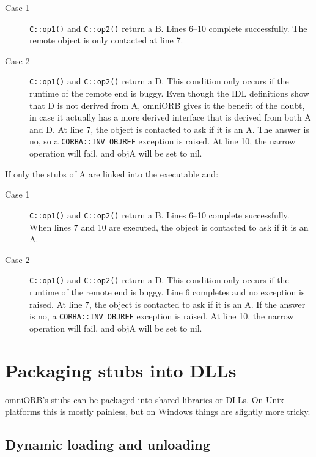 \documentclass[11pt,oneside,a4paper]{book}
\newcommand{\code}[1]{\texttt{#1}}
\newcommand{\op}[1]{\texttt{#1()}}
\begin{document}
\begin{description}
\item[Case 1] \op{C::op1} and \op{C::op2} return a B. Lines 6--10
complete successfully. The remote object is only contacted at line 7.

\item[Case 2] \op{C::op1} and \op{C::op2} return a D. This condition
only occurs if the runtime of the remote end is buggy. Even though the
IDL definitions show that D is not derived from A, omniORB gives it
the benefit of the doubt, in case it actually has a more derived
interface that is derived from both A and D. At line 7, the object is
contacted to ask if it is an A. The answer is no, so a
\code{CORBA::INV\_OBJREF} exception is raised. At line 10, the narrow
operation will fail, and objA will be set to nil.
\end{description}

\noindent If only the stubs of A are linked into the executable and:

\begin{description}
\item[Case 1] \op{C::op1} and \op{C::op2} return a B. Lines 6--10
complete successfully. When lines 7 and 10 are executed, the object is
contacted to ask if it is an A.

\item[Case 2] \op{C::op1} and \op{C::op2} return a D. This condition
only occurs if the runtime of the remote end is buggy. Line 6
completes and no exception is raised. At line 7, the object is
contacted to ask if it is an A. If the answer is no, a
\code{CORBA::INV\_OBJREF} exception is raised. At line 10, the narrow
operation will fail, and objA will be set to nil.
\end{description}





\chapter{Packaging stubs into DLLs}
\label{chap:dlls}


omniORB's stubs can be packaged into shared libraries or DLLs. On Unix
platforms this is mostly painless, but on Windows things are slightly
more tricky.


\section{Dynamic loading and unloading}
\end{document}
